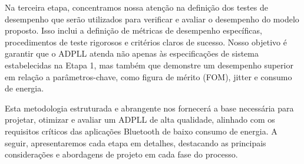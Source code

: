 Na terceira etapa, concentramos nossa atenção na definição dos testes de desempenho que serão utilizados para verificar e avaliar o desempenho do modelo proposto. Isso inclui a definição de métricas de desempenho específicas, procedimentos de teste rigorosos e critérios claros de sucesso. Nosso objetivo é garantir que o ADPLL atenda não apenas às especificações de sistema estabelecidas na Etapa 1, mas também que demonstre um desempenho superior em relação a parâmetros-chave, como figura de mérito (FOM), jitter e consumo de energia.

Esta metodologia estruturada e abrangente nos fornecerá a base necessária para projetar, otimizar e avaliar um ADPLL de alta qualidade, alinhado com os requisitos críticos das aplicações Bluetooth de baixo consumo de energia. A seguir, apresentaremos cada etapa em detalhes, destacando as principais considerações e abordagens de projeto em cada fase do processo.










